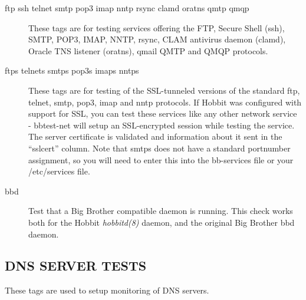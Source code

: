  \begin{description}
\item[ftp ssh telnet smtp pop3 imap nntp rsync clamd oratns qmtp qmqp]
  These tags are for testing services offering the FTP, Secure Shell
  (ssh), SMTP, POP3, IMAP, NNTP, rsync, CLAM antivirus daemon (clamd),
  Oracle TNS listener (oratns), qmail QMTP and QMQP protocols. 


 

\item[ftps telnets smtps pop3s imaps nntps] These tags are for testing
  of the SSL-tunneled versions of the standard ftp, telnet, smtp,
  pop3, imap and nntp protocols. If Hobbit was configured with support
  for SSL, you can test these services like any other network service
  - bbtest-net will setup an SSL-encrypted session while testing the
  service. The server certificate is validated and information about
  it sent in the ``sslcert'' column. Note that smtps does not have a
  standard portnumber assignment, so you will need to enter this into
  the bb-services file or your /etc/services file. 


 

\item[bbd] Test that a Big Brother compatible daemon is running. This
  check works both for the Hobbit \emph{hobbitd(8)} daemon, and the
  original Big Brother bbd daemon. 


 


 


\end{description}

\subsection{DNS SERVER TESTS}
 These tags are used to setup monitoring of DNS servers. 

